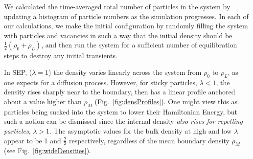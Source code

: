 \documentclass[
reprint, amsmath,amssymb, aps,
 pre, longbibliography,
]{revtex4-1}
\begin{document}
We calculated the time-averaged total number of particles in
the system by updating a histogram of particle numbers
as the simulation progresses. In each of our calculations, we make the
initial configuration by randomly filling the system with particles
and vacancies in such a way that the initial density should be
$\frac{1}{2}(\rho_0 + \rho_L)$, and then run the system for a
sufficient number of equilibration steps to destroy any initial
transients.

In SEP, ($\lambda=1$) the density varies linearly across the system
from $\rho_0$ to $\rho_L$, as one expects for a diffusion process.
However, for sticky particles, $\lambda<1$, the density rises sharply
near to the boundary, then has a linear profile anchored about a value higher
than $\rho_M$  (Fig.~\ref{fig:densProfiles}). 
One might view this as particles being sucked into the
system to lower their Hamiltonian Energy, but such a notion can be
dismissed since the internal density {\it also rises for repelling
  particles}, $\lambda>1$.  The asymptotic values for the bulk density at
high and low $\lambda$ appear to be 1 and $\frac{2}{3}$ respectively, regardless of the 
mean boundary density $\rho_M$ (see Fig.~\ref{fig:wideDensities}). 
\end{document}
